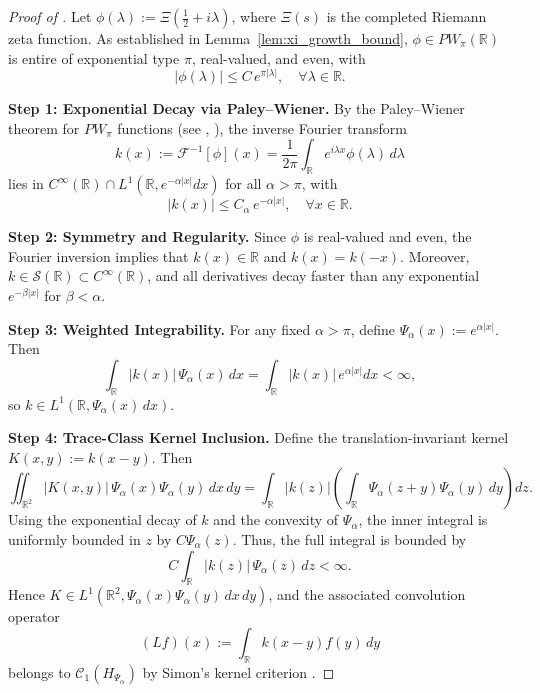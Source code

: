 \begin{proof}[Proof of ]
Let \( \phi(\lambda) := \Xi\left( \tfrac{1}{2} + i\lambda \right) \), where \( \Xi(s) \) is the completed Riemann zeta function. As established in Lemma~\ref{lem:xi_growth_bound}, \( \phi \in PW_\pi(\mathbb{R}) \) is entire of exponential type \( \pi \), real-valued, and even, with
\[
|\phi(\lambda)| \le C\, e^{\pi |\lambda|}, \quad \forall \lambda \in \mathbb{R}.
\]

\medskip
\noindent\textbf{Step 1: Exponential Decay via Paley–Wiener.}
By the Paley–Wiener theorem for \( PW_\pi \) functions (see \cite[Thm.~3.2.4]{Levin1996EntireLectures}, \cite[Ch.~IX.4]{ReedSimon1975II}), the inverse Fourier transform
\[
k(x) := \mathscr{F}^{-1}[\phi](x) = \frac{1}{2\pi} \int_{\mathbb{R}} e^{i\lambda x} \phi(\lambda)\, d\lambda
\]
lies in \( C^\infty(\mathbb{R}) \cap L^1(\mathbb{R}, e^{-\alpha |x|} dx) \) for all \( \alpha > \pi \), with
\[
|k(x)| \le C_\alpha\, e^{-\alpha |x|}, \quad \forall x \in \mathbb{R}.
\]

\medskip
\noindent\textbf{Step 2: Symmetry and Regularity.}
Since \( \phi \) is real-valued and even, the Fourier inversion implies that \( k(x) \in \mathbb{R} \) and \( k(x) = k(-x) \). Moreover, \( k \in \mathcal{S}(\mathbb{R}) \subset C^\infty(\mathbb{R}) \), and all derivatives decay faster than any exponential \( e^{-\beta |x|} \) for \( \beta < \alpha \).

\medskip
\noindent\textbf{Step 3: Weighted Integrability.}
For any fixed \( \alpha > \pi \), define \( \Psi_\alpha(x) := e^{\alpha |x|} \). Then
\[
\int_{\mathbb{R}} |k(x)|\, \Psi_\alpha(x)\, dx = \int_{\mathbb{R}} |k(x)|\, e^{\alpha |x|} dx < \infty,
\]
so \( k \in L^1(\mathbb{R}, \Psi_\alpha(x)\, dx) \).

\medskip
\noindent\textbf{Step 4: Trace-Class Kernel Inclusion.}
Define the translation-invariant kernel \( K(x,y) := k(x - y) \). Then
\[
\iint_{\mathbb{R}^2} |K(x,y)|\, \Psi_\alpha(x)\Psi_\alpha(y)\, dx\, dy
= \int_{\mathbb{R}} |k(z)| \left( \int_{\mathbb{R}} \Psi_\alpha(z + y)\Psi_\alpha(y)\, dy \right) dz.
\]
Using the exponential decay of \( k \) and the convexity of \( \Psi_\alpha \), the inner integral is uniformly bounded in \( z \) by \( C \Psi_\alpha(z) \). Thus, the full integral is bounded by
\[
C \int_{\mathbb{R}} |k(z)|\, \Psi_\alpha(z)\, dz < \infty.
\]
Hence \( K \in L^1(\mathbb{R}^2, \Psi_\alpha(x)\Psi_\alpha(y)\, dx\, dy) \), and the associated convolution operator
\[
(Lf)(x) := \int_{\mathbb{R}} k(x - y) f(y)\, dy
\]
belongs to \( \mathcal{C}_1(H_{\Psi_\alpha}) \) by Simon’s kernel criterion \cite[Thm.~4.2]{Simon2005TraceIdeals}.
\end{proof}

